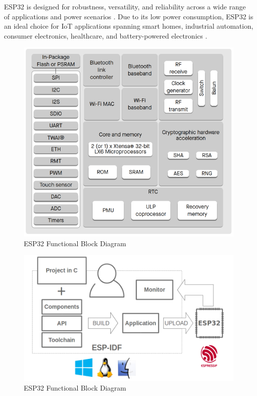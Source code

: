 ESP32 is designed for robustness, versatility, and reliability across a wide range of applications and power scenarios \cite[2]{esp32-series}. Due to its low power consumption, ESP32 is an ideal choice for IoT applications spanning smart homes, industrial automation, consumer electronics, healthcare, and battery-powered electronics \cite[5]{esp32-series} \cite[6]{esp32-module}.
 

\begin{figure}
	\centering
	\includegraphics[scale=.5]{abbildungen/functional-block-diagram}
	\caption{ESP32 Functional Block Diagram} \label{Fig:esp32-crypto}
\end{figure}

\begin{figure}
	\centering
	\includegraphics[scale=.5]{abbildungen/esp-idf.png}
	\caption{ESP32 Functional Block Diagram} \label{Fig:esp-idf}
\end{figure}

